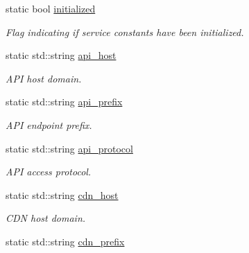 \begin{DoxyCompactItemize}
\item 
static bool \hyperlink{classEmojidex_1_1Service_1_1Settings_af71baa4b94fd1dabfbcb0fef7e40e551}{initialized}
\begin{DoxyCompactList}\small\item\em Flag indicating if service constants have been initialized. \end{DoxyCompactList}\item 
static std\+::string \hyperlink{classEmojidex_1_1Service_1_1Settings_a5192b05e10865349f7531e9b48f059d3}{api\+\_\+host}\hypertarget{classEmojidex_1_1Service_1_1Settings_a5192b05e10865349f7531e9b48f059d3}{}\label{classEmojidex_1_1Service_1_1Settings_a5192b05e10865349f7531e9b48f059d3}

\begin{DoxyCompactList}\small\item\em A\+PI host domain. \end{DoxyCompactList}\item 
static std\+::string \hyperlink{classEmojidex_1_1Service_1_1Settings_a91475013a914fb4a5b557a7bb9fa84a6}{api\+\_\+prefix}\hypertarget{classEmojidex_1_1Service_1_1Settings_a91475013a914fb4a5b557a7bb9fa84a6}{}\label{classEmojidex_1_1Service_1_1Settings_a91475013a914fb4a5b557a7bb9fa84a6}

\begin{DoxyCompactList}\small\item\em A\+PI endpoint prefix. \end{DoxyCompactList}\item 
static std\+::string \hyperlink{classEmojidex_1_1Service_1_1Settings_a102c707a10874ba2db39222153d230ef}{api\+\_\+protocol}\hypertarget{classEmojidex_1_1Service_1_1Settings_a102c707a10874ba2db39222153d230ef}{}\label{classEmojidex_1_1Service_1_1Settings_a102c707a10874ba2db39222153d230ef}

\begin{DoxyCompactList}\small\item\em A\+PI access protocol. \end{DoxyCompactList}\item 
static std\+::string \hyperlink{classEmojidex_1_1Service_1_1Settings_aafcb2e6bd54ab9773a450282b7e76773}{cdn\+\_\+host}\hypertarget{classEmojidex_1_1Service_1_1Settings_aafcb2e6bd54ab9773a450282b7e76773}{}\label{classEmojidex_1_1Service_1_1Settings_aafcb2e6bd54ab9773a450282b7e76773}

\begin{DoxyCompactList}\small\item\em C\+DN host domain. \end{DoxyCompactList}\item 
static std\+::string \hyperlink{classEmojidex_1_1Service_1_1Settings_a4540c869e1b27ee4bd9426ea7486c35e}{cdn\+\_\+prefix}\hypertarget{classEmojidex_1_1Service_1_1Settings_a4540c869e1b27ee4bd9426ea7486c35e}{}\label{classEmojidex_1_1Service_1_1Settings_a4540c869e1b27ee4bd9426ea7486c35e}


\end{DoxyCompactItemize}
